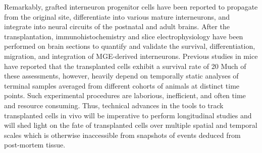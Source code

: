 Remarkably,  grafted interneuron progenitor cells have been reported to propagate from the  original site, differentiate into various mature interneurons, and integrate  into neural circuits of the postnatal and adult brains. After the  transplantation, immunohistochemistry and slice electrophysiology have been  performed on brain sections to quantify and validate the survival,  differentiation, migration, and integration of MGE-derived interneurons.  Previous studies in mice have reported that the transplanted cells exhibit a  survival rate of 20 %
Much of these  assessments, however, heavily depend on temporally static analyses of terminal  samples averaged from different cohorts of animals at distinct time points.  Such experimental procedures are laborious, inefficient, and often time and  resource consuming. Thus, technical advances in the tools to track transplanted  cells in vivo will be imperative to perform longitudinal studies and will shed  light on the fate of transplanted cells over multiple spatial and temporal  scales which is otherwise inaccessible from snapshots of events deduced from  post-mortem tissue. 



